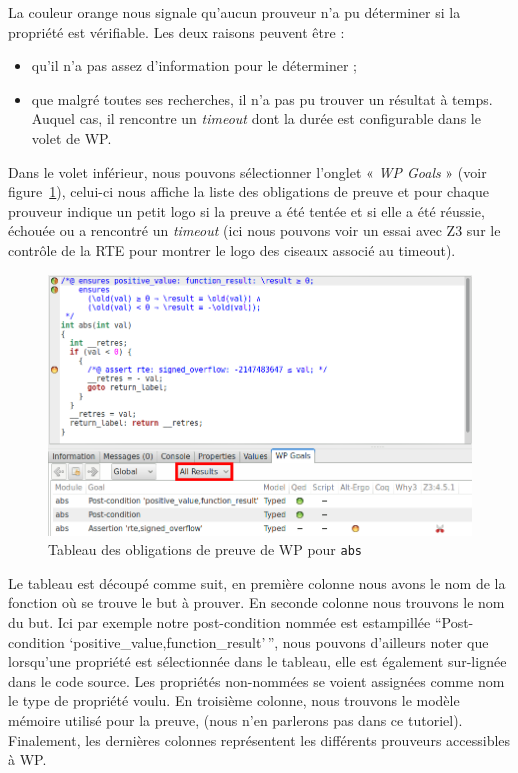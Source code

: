 \documentclass[12pt,francais,]{scrbook}
\providecommand{\tightlist}{%
  \setlength{\itemsep}{0pt}\setlength{\parskip}{0pt}}
\begin{document}
La couleur orange nous signale qu'aucun prouveur n'a pu déterminer si la
propriété est vérifiable. Les deux raisons peuvent être :

\begin{itemize}
\tightlist
\item
  qu'il n'a pas assez d'information pour le déterminer ;
\item
  que malgré toutes ses recherches, il n'a pas pu trouver un résultat à
  temps. Auquel cas, il rencontre un \emph{timeout} dont la durée est
  configurable dans le volet de WP.
\end{itemize}

Dans le volet inférieur, nous pouvons sélectionner l'onglet « \emph{WP
  Goals} » (voir figure~\ref{fig:2-1-1-abs-5}), celui-ci nous affiche la
liste des obligations de preuve et
pour chaque prouveur indique un petit logo si la preuve a été tentée et
si elle a été réussie, échouée ou a rencontré un \emph{timeout} (ici
nous pouvons voir un essai avec Z3 sur le contrôle de la RTE pour
montrer le logo des ciseaux associé au timeout).

\begin{figure}[htbp]
\centering
\includegraphics[scale=0.5]{2-1-1-abs-5.png}
\caption{Tableau des obligations de preuve de WP pour \texttt{abs}}
\label{fig:2-1-1-abs-5}
\end{figure}

Le tableau est découpé comme suit, en première colonne nous avons le nom
de la fonction où se trouve le but à prouver. En seconde colonne nous
trouvons le nom du but. Ici par exemple notre post-condition nommée est
estampillée ``Post-condition `positive\_value,function\_result'\,'',
nous pouvons d'ailleurs noter que lorsqu'une propriété est sélectionnée
dans le tableau, elle est également sur-lignée dans le code source. Les
propriétés non-nommées se voient assignées comme nom le type de
propriété voulu. En troisième colonne, nous trouvons le modèle mémoire
utilisé pour la preuve, (nous n'en parlerons pas dans ce tutoriel).
Finalement, les dernières colonnes représentent les différents prouveurs
accessibles à WP.
\end{document}
